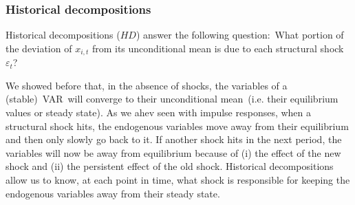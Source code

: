 \documentclass[10pt]{article}
\begin{document}
\subsubsection{Historical decompositions}

Historical decompositions ($HD$) answer the following question:\ What
portion of the deviation of $x_{i,t}$ from its unconditional mean is due to
each structural shock $\varepsilon _{t}$?

We showed before that, in the absence of shocks, the variables of a
(stable)\ VAR\ will converge to their unconditional mean\ (i.e. their
equilibrium values or steady state). As we ahev seen with impulse responses,
when a structural shock hits, the endogenous variables move away from their
equilibrium and then only slowly go back to it. If another shock hits in the
next period, the variables will now be away from equilibrium because of (i)
the effect of the new shock and (ii) the persistent effect of the old shock.
Historical decompositions allow us to know, at each point in time, what
shock is responsible for keeping the endogenous variables away from their
steady state.
\end{document}
